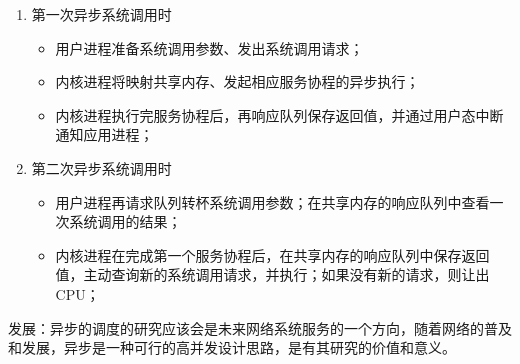 \begin{enumerate}
    \item 第一次异步系统调用时
    \begin{itemize}
        \item 用户进程准备系统调用参数、发出系统调用请求；
        \item 内核进程将映射共享内存、发起相应服务协程的异步执行；
        \item 内核进程执行完服务协程后，再响应队列保存返回值，并通过用户态中断通知应用进程；
    \end{itemize}

    \item 第二次异步系统调用时
    \begin {itemize}
        \item 用户进程再请求队列转杯系统调用参数；在共享内存的响应队列中查看一次系统调用的结果；
        \item 内核进程在完成第一个服务协程后，在共享内存的响应队列中保存返回值，主动查询新的系统调用请求，并执行；如果没有新的请求，则让出CPU；
    \end{itemize}
\end{enumerate}

发展：异步的调度的研究应该会是未来网络系统服务的一个方向，随着网络的普及和发展，异步是一种可行的高并发设计思路，是有其研究的价值和意义。



